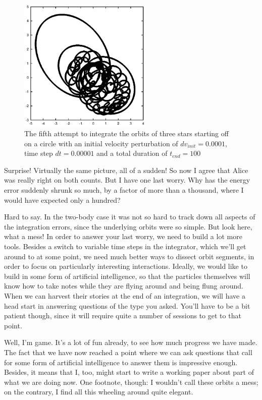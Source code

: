 \begin{figure}[htb]
\centering
\includegraphics[width=2.5in]{chap5/leapfrog2a_0.00001_100.ps}
\caption[Three stars on a circle, leapfrog, $dv_{init}=0.0001$, $dt = 0.00001$,
$t_{end} = 100$]
{The fifth attempt to integrate the orbits of three stars
starting off on a circle with an initial velocity perturbation of 
$dv_{init}=0.0001$, time step $dt = 0.00001$ and a total duration of
$t_{end} = 100$}
\label{fig:leap2a-0.00001-100}
\end{figure}

\abc

\bob
Surprise!  Virtually the same picture, all of a sudden!  So now I
agree that Alice was really right on both counts.  But I have one last
worry.  Why has the energy error suddenly shrunk so much, by a factor
of more than a thousand, where I would have expected only a hundred?

\alice
Hard to say.  In the two-body case it was not so hard to track down
all aspects of the integration errors, since the underlying orbits
were so simple.  But look here, what a mess!  In order to answer
your last worry, we need to build a lot more tools.  Besides a switch
to variable time steps in the integrator, which we'll get around to at
some point, we need much better ways to dissect orbit segments, in
order to focus on particularly interesting interactions.  Ideally, we
would like to build in some form of artificial intelligence, so that
the particles themselves will know how to take notes while they are
flying around and being flung around.  When we can harvest their
stories at the end of an integration, we will have a head start in
answering questions of the type you asked.  You'll have to be a bit
patient though, since it will require quite a number of sessions to
get to that point.

\carol
Well, I'm game.  It's a lot of fun already, to see how much progress
we have made.  The fact that we have now reached a point where we can
ask questions that call for some form of artificial intelligence to
answer them is impressive enough.  Besides, it means that I, too,
might start to write a working paper about part of what we are doing
now.  One footnote, though: I wouldn't call these orbits a mess; on
the contrary, I find all this wheeling around quite elegant.

